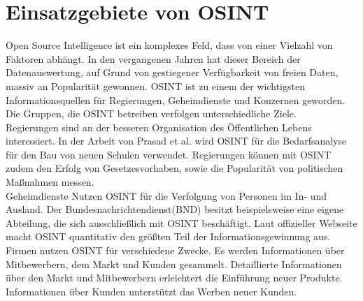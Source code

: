 \documentclass[twoside,a4paper]{article}
\begin{document}
\section{Einsatzgebiete von OSINT}
Open Source Intelligence ist ein komplexes Feld, dass von einer Vielzahl von Faktoren abhängt. In den vergangenen Jahren hat dieser Bereich der Datenauswertung, auf Grund von gestiegener Verfügbarkeit von freien Daten, massiv an Popularität gewonnen. OSINT ist zu einem der wichtigsten Informationsquellen für Regierungen, Geheimdienste und Konzernen geworden.\\
Die Gruppen, die OSINT betreiben verfolgen unterschiedliche Ziele.\\
Regierungen sind an der besseren Organisation des Öffentlichen Lebens interessiert. In der Arbeit von Prasad et al.\cite{data_consolidation_solution} wird OSINT für die Bedarfsanalyse für den Bau von neuen Schulen verwendet. Regierungen können mit OSINT zudem den Erfolg von Gesetzesvorhaben, sowie die Popularität von politischen Maßnahmen messen.\\
Geheimdienste Nutzen OSINT für die Verfolgung von Personen im In- und Ausland. Der Bundesnachrichtendienst(BND) besitzt beispielsweise eine eigene Abteilung, die sich ausschließlich mit OSINT beschäftigt. Laut offizieller Webseite\cite{bndOsint} macht OSINT quantitativ den größten Teil der Informationsgewinnung aus.\\
Firmen nutzen OSINT für verschiedene Zwecke. Es werden Informationen über Mitbewerbern, dem Markt und Kunden gesammelt. Detaillierte  Informationen über den Markt und Mitbewerbern erleichtert die Einführung neuer Produkte. Informationen über Kunden unterstützt das Werben neuer Kunden.
\end{document}

